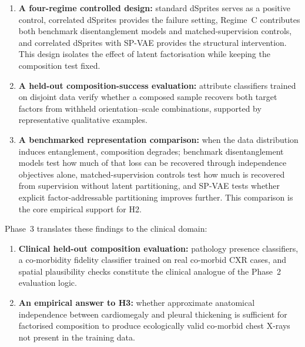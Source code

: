 \begin{enumerate}

    \item \textbf{A four-regime controlled design:} standard dSprites serves as a positive
    control, correlated dSprites provides the failure setting, Regime~C contributes both benchmark
    disentanglement models and matched-supervision controls, and correlated dSprites with SP-VAE
    provides the structural intervention. This design isolates the effect of latent factorisation
    while keeping the composition test fixed.

    \item \textbf{A held-out composition-success evaluation:} attribute classifiers trained on
    disjoint data verify whether a composed sample recovers both target factors from withheld
    orientation--scale combinations, supported by representative qualitative examples.

    \item \textbf{A benchmarked representation comparison:} when the data distribution induces
    entanglement, composition degrades; benchmark disentanglement models test how much of that loss
    can be recovered through independence objectives alone, matched-supervision controls test how
    much is recovered from supervision without latent partitioning, and SP-VAE tests whether
    explicit factor-addressable partitioning improves further. This comparison is the core
    empirical support for H2.

\end{enumerate}

Phase~3 translates these findings to the clinical domain:

\begin{enumerate}

    \item \textbf{Clinical held-out composition evaluation:} pathology presence classifiers, a
    co-morbidity fidelity classifier trained on real co-morbid CXR cases, and spatial plausibility
    checks constitute the clinical analogue of the Phase~2 evaluation logic.

    \item \textbf{An empirical answer to H3:} whether approximate anatomical independence between
    cardiomegaly and pleural thickening is sufficient for factorised composition to produce
    ecologically valid co-morbid chest X-rays not present in the training data.

\end{enumerate}

